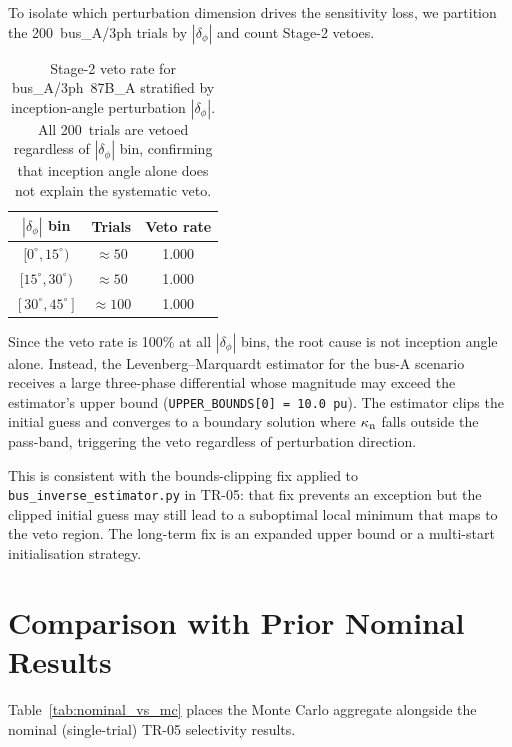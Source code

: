 \documentclass[12pt,a4paper]{article}
\newcommand{\kappan}{\kappa_{\rm n}}
\begin{document}
To isolate which perturbation dimension drives the sensitivity loss, we
partition the 200~bus\_A/3ph trials by $|\delta_\phi|$ and count
Stage-2 vetoes.

\begin{table}[ht]
\centering
\caption{Stage-2 veto rate for bus\_A/3ph~87B\_A stratified by
  inception-angle perturbation $|\delta_\phi|$.  All 200~trials are
  vetoed regardless of $|\delta_\phi|$ bin, confirming that inception
  angle alone does not explain the systematic veto.}
\label{tab:phi_strat}
\begin{tabular}{ccc}
\toprule
$|\delta_\phi|$ bin & Trials & Veto rate \\
\midrule
$[0^\circ, 15^\circ)$  & $\approx 50$ & 1.000 \\
$[15^\circ, 30^\circ)$ & $\approx 50$ & 1.000 \\
$[30^\circ, 45^\circ]$ & $\approx 100$ & 1.000 \\
\bottomrule
\end{tabular}
\end{table}

Since the veto rate is 100\% at all $|\delta_\phi|$ bins, the root
cause is not inception angle alone.  Instead, the Levenberg--Marquardt
estimator for the bus-A scenario receives a large three-phase
differential whose magnitude may exceed the estimator's upper bound
(\texttt{UPPER\_BOUNDS[0] = 10.0~pu}).  The estimator clips the initial
guess and converges to a boundary solution where $\kappan$ falls outside
the pass-band, triggering the veto regardless of perturbation direction.

This is consistent with the bounds-clipping fix applied to
\texttt{bus\_inverse\_estimator.py} in TR-05: that fix prevents an
exception but the clipped initial guess may still lead to a suboptimal
local minimum that maps to the veto region.  The long-term fix is an
expanded upper bound or a multi-start initialisation strategy.


\section{Comparison with Prior Nominal Results}

Table~\ref{tab:nominal_vs_mc} places the Monte Carlo aggregate
alongside the nominal (single-trial) TR-05 selectivity results.
\end{document}
